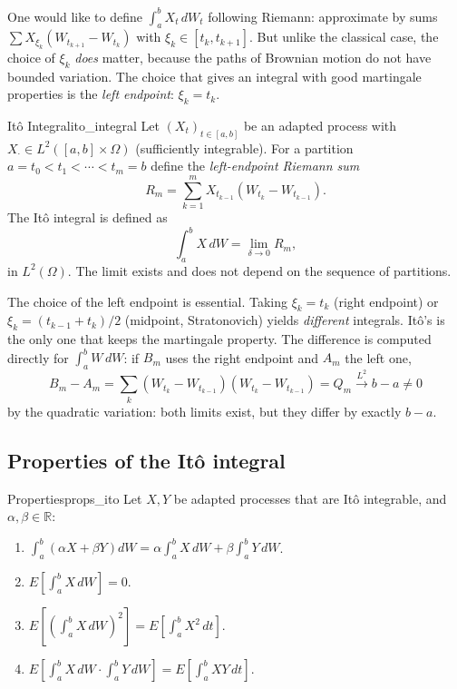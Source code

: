 \documentclass[11pt, a4paper]{article}
\begin{document}
One would like to define $\int_a^b X_t \, dW_t$ following Riemann: approximate by sums
$\sum X_{\xi_k} (W_{t_{k+1}} - W_{t_k})$ with $\xi_k \in [t_k, t_{k+1}]$. But unlike the
classical case, the choice of $\xi_k$ \emph{does} matter, because the paths of Brownian motion
do not have bounded variation. The choice that gives an integral with good martingale properties
is the \emph{left endpoint}: $\xi_k = t_k$.

\begin{definicion}{Itô Integral}{ito_integral}
Let $(X_t)_{t \in [a, b]}$ be an adapted process with $X_\cdot \in L^2([a, b] \times \Omega)$
(sufficiently integrable).
For a partition $a = t_0 < t_1 < \cdots < t_m = b$ define the \emph{left-endpoint Riemann
sum}
$$ R_m = \sum_{k=1}^m X_{t_{k-1}} (W_{t_k} - W_{t_{k-1}}). $$
The Itô integral is defined as
$$ \int_a^b X \, dW = \lim_{\delta \to 0} R_m, $$
in $L^2(\Omega)$. The limit exists and does not depend on the sequence of partitions.
\end{definicion}

\obs The choice of the left endpoint is essential. Taking $\xi_k = t_k$ (right endpoint) or
$\xi_k = (t_{k-1} + t_k)/2$ (midpoint, Stratonovich) yields \emph{different} integrals.
Itô's is the only one that keeps the martingale property. The difference is
computed directly for $\int_a^b W \, dW$: if $B_m$ uses the right endpoint and $A_m$ the
left one,
$$ B_m - A_m = \sum_k \left( W_{t_k} - W_{t_{k-1}} \right) \left( W_{t_k} - W_{t_{k-1}} \right)
= Q_m \xrightarrow{L^2} b - a \ne 0 $$
by the quadratic variation: both limits exist, but they differ by exactly $b - a$.

\subsection{Properties of the Itô integral}

\begin{proposicion}{Properties}{props_ito}
Let $X, Y$ be adapted processes that are Itô integrable, and $\alpha, \beta \in \mathbb{R}$:
\begin{enumerate}
    \item $\int_a^b (\alpha X + \beta Y) dW = \alpha \int_a^b X \, dW + \beta \int_a^b Y \, dW$.
    \item $\displaystyle E\!\left[\int_a^b X \, dW\right] = 0$.
    \item $\displaystyle E\!\left[\left(\int_a^b X \, dW\right)^2 \right] = E\!\left[\int_a^b X^2
    \, dt\right]$.
    \item $\displaystyle E\!\left[\int_a^b X \, dW \cdot \int_a^b Y \, dW\right] =
    E\!\left[\int_a^b XY \, dt\right]$.
\end{enumerate}
\end{proposicion}
\end{document}
